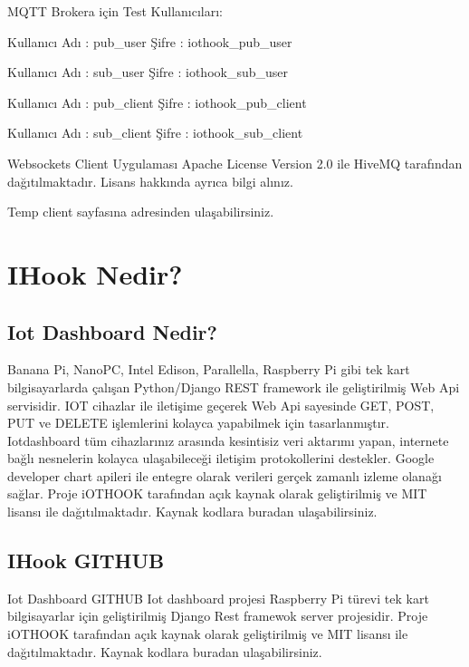 \documentclass[letterpaper,10pt,turkish]{sphinxmanual}
\begin{document}
MQTT Brokera için Test Kullanıcıları:

Kullanıcı Adı : pub\_user Şifre : iothook\_pub\_user

Kullanıcı Adı : sub\_user Şifre : iothook\_sub\_user

Kullanıcı Adı : pub\_client Şifre : iothook\_pub\_client

Kullanıcı Adı : sub\_client Şifre : iothook\_sub\_client

Websockets Client Uygulaması Apache License Version 2.0 ile HiveMQ  tarafından dağıtılmaktadır. Lisans hakkında ayrıca bilgi alınız.

Temp client sayfasına
adresinden ulaşabilirsiniz.


\section{IHook Nedir?}
\label{\detokenize{what-is-ihook::doc}}\label{\detokenize{what-is-ihook:ihook-nedir}}\label{\detokenize{what-is-ihook:what-is-ihook}}

\subsection{Iot Dashboard Nedir?}
\label{\detokenize{what-is-ihook:iot-dashboard-nedir}}
Banana Pi, NanoPC, Intel Edison, Parallella, Raspberry Pi gibi tek kart bilgisayarlarda çalışan Python/Django REST framework ile geliştirilmiş Web Api servisidir. IOT cihazlar ile iletişime geçerek Web Api sayesinde GET, POST, PUT ve DELETE işlemlerini kolayca yapabilmek için tasarlanmıştır.
Iotdashboard tüm cihazlarınız arasında kesintisiz veri aktarımı yapan, internete bağlı nesnelerin kolayca ulaşabileceği iletişim protokollerini destekler. Google developer chart apileri ile entegre olarak verileri gerçek zamanlı izleme olanağı sağlar.
Proje iOTHOOK tarafından açık kaynak olarak geliştirilmiş ve MIT lisansı ile dağıtılmaktadır. Kaynak kodlara  buradan  ulaşabilirsiniz.


\subsection{IHook GITHUB}
\label{\detokenize{what-is-ihook:ihook-github}}
Iot Dashboard GITHUB
Iot dashboard projesi Raspberry Pi türevi tek kart bilgisayarlar için geliştirilmiş Django Rest framewok server projesidir.
Proje iOTHOOK tarafından açık kaynak olarak geliştirilmiş ve MIT lisansı ile dağıtılmaktadır. Kaynak kodlara  buradan ulaşabilirsiniz.



\renewcommand{\indexname}{Dizin}
\printindex
\end{document}
